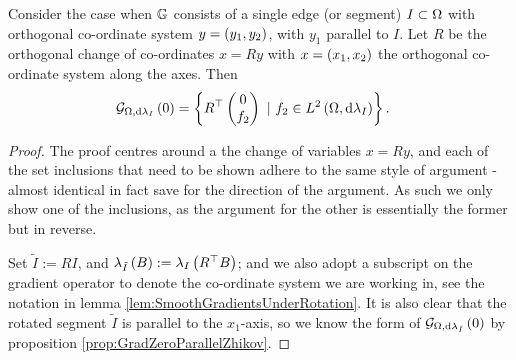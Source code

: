 \begin{prop} \label{prop:RotationOfEdgeGradients}
	Consider the case when $\mathbb{G}$ consists of a single edge (or segment) $I\subset\Omega$ with orthogonal co-ordinate system $y=\left( y_1,y_2 \right)$, with $y_1$ parallel to $I$.
	Let $R$ be the orthogonal change of co-ordinates $x=Ry$ with $x=\left( x_1,x_2 \right)$ the orthogonal co-ordinate system along the axes.
	Then
	\begin{align*}
		\mathcal{G}_{ \Omega, \mathrm{d}\lambda_I}\left( 0 \right) 
		&= \left\{  R^{\top} \begin{pmatrix} 0 \\ f_2 \end{pmatrix} \ \vert \ f_2\in L^{2}\left( \Omega,\mathrm{d}\lambda_I \right)  \right\}.
	\end{align*}
\end{prop}
\begin{proof}
	The proof centres around a the change of variables $x=Ry$, and each of the set inclusions that need to be shown adhere to the same style of argument - almost identical in fact save for the direction of the argument.
	As such we only show one of the inclusions, as the argument for the other is essentially the former but in reverse. \newline
	
	Set $\tilde{I} := RI$, and $\lambda_{\tilde{I}}\left( B \right) := \lambda_{I}\left( R^{\top}B \right)$; and we also adopt a subscript on the gradient operator to denote the co-ordinate system we are working in, see the notation in lemma \ref{lem:SmoothGradientsUnderRotation}.
	It is also clear that the rotated segment $\tilde{I}$ is parallel to the $x_1$-axis, so we know the form of $\mathcal{G}_{ \Omega, \mathrm{d}\lambda_{\tilde{I}}}\left( 0 \right)$ by proposition \ref{prop:GradZeroParallelZhikov}. \newline
	

\end{proof}
